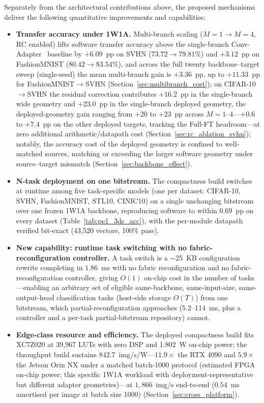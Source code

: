 \documentclass[12pt, a4paper]{report}
\numberwithin{equation}{chapter}
\numberwithin{figure}{chapter}
\numberwithin{table}{chapter}
\numberwithin{algorithm}{chapter}
\begin{document}
Separately from the architectural contributions above, the proposed mechanisms deliver the following quantitative improvements and capabilities:
\begin{itemize}
    \item \textbf{Transfer accuracy under 1W1A.} Multi-branch scaling ($M{=}1\to M{=}4$, RC enabled) lifts software transfer accuracy above the single-branch Conv-Adapter~\cite{Chen2024ConvAdapter} baseline by $+6.09$~pp on SVHN ($73.72\to79.81\%$) and $+3.12$~pp on FashionMNIST ($80.42\to83.54\%$), and across the full twenty backbone--target sweep (single-seed) the mean multi-branch gain is $+3.36$~pp, up to $+11.33$~pp for FashionMNIST$\to$SVHN (Section~\ref{sec:multibranch_cost}); on CIFAR-10$\to$SVHN the residual correction contributes $+16.2$~pp in the single-branch wide geometry and $+23.0$~pp in the single-branch deployed geometry, the deployed-geometry gain ranging from $+20$ to $+23$~pp across $M{=}1$--$4$---$+0.6$ to $+7.4$~pp on the other deployed targets, tracking the Full-FT headroom---at zero additional arithmetic/datapath cost (Section~\ref{sec:rc_ablation_svhn}); notably, the accuracy cost of the deployed geometry is confined to well-matched sources, matching or exceeding the larger software geometry under source--target mismatch (Section~\ref{sec:backbone_effect}).
    \item \textbf{N-task deployment on one bitstream.} The compactness build switches at runtime among five task-specific models (one per dataset: CIFAR-10, SVHN, FashionMNIST, STL10, CINIC10) on a single unchanging bitstream over one frozen 1W1A backbone, reproducing software to within $0.69$~pp on every dataset (Table~\ref{tab:pe1_3ds_acc}), with the per-module datapath verified bit-exact (43{,}520 vectors, 100\% pass).
    \item \textbf{New capability: runtime task switching with no fabric-reconfiguration controller.} A task switch is a $\sim$25~KB configuration rewrite completing in $1.86$~ms with no fabric reconfiguration and no fabric-reconfiguration controller, giving $O(1)$ on-chip cost in the number of tasks---enabling an arbitrary set of eligible same-backbone, same-input-size, same-output-head classification tasks (host-side storage $O(T)$) from one bitstream, which partial-reconfiguration approaches (5.2--114~ms, plus a controller and a per-task partial-bitstream repository) cannot.
    \item \textbf{Edge-class resource and efficiency.} The deployed compactness build fits XC7Z020 at 39{,}967 LUTs with zero DSP and 1.802~W on-chip power; the throughput build sustains $842.7$~img/s/W---$11.9\times$ the RTX 4090 and $5.9\times$ the Jetson Orin NX under a matched batch-1000 protocol (estimated FPGA on-chip power; this specific 1W1A workload with deployment-representative but different adapter geometries)---at $1{,}866$~img/s end-to-end ($0.54$~ms amortised per image at batch size 1000) (Section~\ref{sec:cross_platform}).
\end{itemize}
\end{document}
